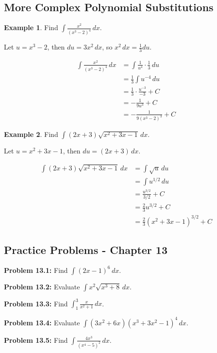 \documentclass[12pt,a4paper]{book}
\theoremstyle{definition}
\newtheorem{example}{Example}[chapter]
\begin{document}
\subsection{More Complex Polynomial Substitutions}

\begin{example}
Find $\int \frac{x^2}{(x^3 - 2)^4} \, dx$.

Let $u = x^3 - 2$, then $du = 3x^2 \, dx$, so $x^2 \, dx = \frac{1}{3} du$.

\begin{align}
\int \frac{x^2}{(x^3 - 2)^4} \, dx &= \int \frac{1}{u^4} \cdot \frac{1}{3} \, du\\
&= \frac{1}{3} \int u^{-4} \, du\\
&= \frac{1}{3} \cdot \frac{u^{-3}}{-3} + C\\
&= -\frac{1}{9u^3} + C\\
&= -\frac{1}{9(x^3 - 2)^3} + C
\end{align}
\end{example}

\begin{example}
Find $\int (2x + 3)\sqrt{x^2 + 3x - 1} \, dx$.

Let $u = x^2 + 3x - 1$, then $du = (2x + 3) \, dx$.

\begin{align}
\int (2x + 3)\sqrt{x^2 + 3x - 1} \, dx &= \int \sqrt{u} \, du\\
&= \int u^{1/2} \, du\\
&= \frac{u^{3/2}}{3/2} + C\\
&= \frac{2}{3}u^{3/2} + C\\
&= \frac{2}{3}(x^2 + 3x - 1)^{3/2} + C
\end{align}
\end{example}

\subsection{Practice Problems - Chapter 13}

\textbf{Problem 13.1:} Find $\int (2x - 1)^6 \, dx$.

\textbf{Problem 13.2:} Evaluate $\int x^2 \sqrt{x^3 + 8} \, dx$.

\textbf{Problem 13.3:} Find $\int_1^3 \frac{x}{x^2 + 1} \, dx$.

\textbf{Problem 13.4:} Evaluate $\int (3x^2 + 6x)(x^3 + 3x^2 - 1)^4 \, dx$.

\textbf{Problem 13.5:} Find $\int \frac{4x^3}{(x^4 - 5)^2} \, dx$.
\end{document}
